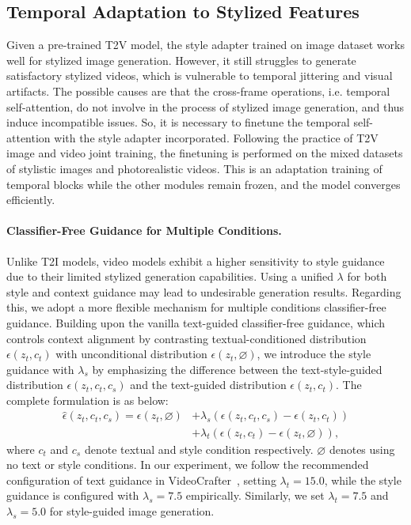 \vspace{-0.5em}
\subsection{Temporal Adaptation to Stylized Features}
\label{subsec:temp_adaptation}

Given a pre-trained T2V model, the style adapter trained on image dataset works well for stylized image generation. However, it still struggles to generate satisfactory stylized videos, which is vulnerable to temporal jittering and visual artifacts.
The possible causes are that the cross-frame operations, i.e. temporal self-attention, do not involve in the process of stylized image generation, and thus induce incompatible issues. So, it is necessary to finetune the temporal self-attention with the style adapter incorporated.
Following the practice of T2V image and video joint training, the finetuning is performed on the mixed datasets of stylistic images and photorealistic videos. This is an adaptation training of temporal blocks while the other modules remain frozen, and the model converges efficiently.

\vspace{-0.5em}
\paragraph{Classifier-Free Guidance for Multiple Conditions.}
Unlike T2I models, video models exhibit a higher sensitivity to style guidance due to their limited stylized generation capabilities. Using a unified $\lambda$ for both style and context guidance may lead to undesirable generation results. Regarding this, we adopt a more flexible mechanism for multiple conditions classifier-free guidance. Building upon the vanilla text-guided classifier-free guidance, which controls context alignment by contrasting textual-conditioned distribution $\epsilon(z_t, c_t)$ with unconditional distribution $\epsilon(z_t, \varnothing)$, we introduce the style guidance with $\lambda_s$ by emphasizing the difference between the text-style-guided distribution $\epsilon(z_t, c_t, c_s)$ and the text-guided distribution $\epsilon(z_t, c_t)$. The complete formulation is as below:
\begin{equation}
    \begin{aligned}
        \hat{\epsilon}(z_t, c_t, c_s) = \epsilon(z_t, \varnothing) &+ \lambda_s(\epsilon(z_t, c_t, c_s) - \epsilon(z_t, c_t)) \\
        &+ \lambda_t(\epsilon(z_t, c_t) - \epsilon(z_t, \varnothing)),
    \end{aligned}
\end{equation}
where $c_t$ and $c_s$ denote textual and style condition respectively. $\varnothing$ denotes using no text or style conditions.
In our experiment, we follow the recommended configuration of text guidance in VideoCrafter~\cite{chen2023videocrafter}, setting $\lambda_t = 15.0$, while the style guidance is configured with $\lambda_s = 7.5$ empirically. Similarly, we set $\lambda_t = 7.5$ and $\lambda_s = 5.0$ for style-guided image generation.





